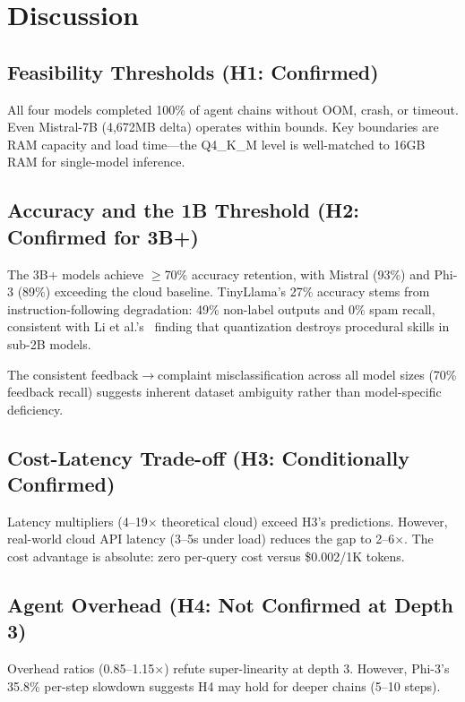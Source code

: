 \documentclass[conference]{IEEEtran}
\begin{document}
\section{Discussion}

\subsection{Feasibility Thresholds (H1: Confirmed)}

All four models completed 100\% of agent chains without OOM, crash, or timeout. Even Mistral-7B (4,672MB delta) operates within bounds. Key boundaries are RAM capacity and load time---the Q4\_K\_M level is well-matched to 16GB RAM for single-model inference.

\subsection{Accuracy and the 1B Threshold (H2: Confirmed for 3B+)}

The 3B+ models achieve $\geq$70\% accuracy retention, with Mistral (93\%) and Phi-3 (89\%) exceeding the cloud baseline. TinyLlama's 27\% accuracy stems from instruction-following degradation: 49\% non-label outputs and 0\% spam recall, consistent with Li et al.'s~\cite{li2026quantization} finding that quantization destroys procedural skills in sub-2B models.

The consistent feedback$\rightarrow$complaint misclassification across all model sizes (70\% feedback recall) suggests inherent dataset ambiguity rather than model-specific deficiency.

\subsection{Cost-Latency Trade-off (H3: Conditionally Confirmed)}

Latency multipliers (4--19$\times$ theoretical cloud) exceed H3's predictions. However, real-world cloud API latency (3--5s under load) reduces the gap to 2--6$\times$. The cost advantage is absolute: zero per-query cost versus \$0.002/1K tokens.

\subsection{Agent Overhead (H4: Not Confirmed at Depth 3)}

Overhead ratios (0.85--1.15$\times$) refute super-linearity at depth 3. However, Phi-3's 35.8\% per-step slowdown suggests H4 may hold for deeper chains (5--10 steps).
\end{document}
